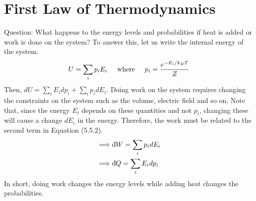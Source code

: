 \section{First Law of Thermodynamics}
    Question: What happens to the energy levels and probabilities if heat is added or work is done on the system? To answer this, let us write the internal energy of the system. 
    \begin{equation}
        U = \sum_ip_iE_i \hspace{0.5cm}\mathrm{where}\hspace{0.5cm} p_i=\frac{e^{-E_i/k_BT}}{Z}
    \end{equation}
    Then, $dU = \sum_iE_idp_i + \sum_ip_idE_i$. Doing work on the system requires changing the constraints on the system such as the volume, electric field and so on. Note that, since the energy $E_i$ depends on these quantities and not $p_i$, changing these will cause a change $dE_i$ in the energy. Therefore, the work must be related to the second term in Equation (5.5.2).
    \begin{align}
        \implies & \text{d}\hspace*{-0.13em}\bar{}\hspace*{0.1em} W = \sum_ip_idE_i \\
        \implies & \text{d}\hspace*{-0.13em}\bar{}\hspace*{0.1em} Q = \sum_iE_idp_i
    \end{align}
    In short, doing work changes the energy levels while adding heat changes the probabilities. 

